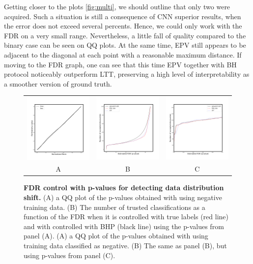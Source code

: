 \documentclass{article}
\begin{document}
Getting closer to the plots \ref{fig:multi}, we should outline that only two were acquired. Such a situation is still a consequence of CNN superior results, when the error does not exceed several percents. Hence, we could only work with the FDR on a very small range. Nevertheless, a little fall of quality compared to the binary case can be seen on QQ plots. At the same time, EPV still appears to be adjacent to the diagonal at each point with a reasonable maximum distance. If moving to the FDR graph, one can see that this time EPV together with BH protocol noticeably outperform LTT, preserving a high level of interpretability as a smoother version of ground truth.


\begin{figure}
    \centering
        \begin{tabular}{ccc}
 		\includegraphics[width=2in]{img/cnn_QQ_shifted.png} &
		\includegraphics[width=2in]{img/cnn_shifted_fdr_control.png} & 
            \includegraphics[width=2in]{img/cnn_shifted_fdr_control_loc.png}
		\\	
		A & B & C
	\end{tabular}
	\caption{{\bf  FDR control with p-values for detecting data distribution shift.}
		(A) a QQ plot of the p-values obtained with using negative training data. (B) The number of trusted classifications as a function of the FDR when it is controlled with true labels (red line) and with controlled with BHP (black line) using the p-values from panel (A).
		(A) a QQ plot of the p-values obtained with using training data classified as negative. (B) The same as panel (B), but using p-values from panel (C).
	}
	\label{fig:shifted}
\end{figure}
\end{document}
